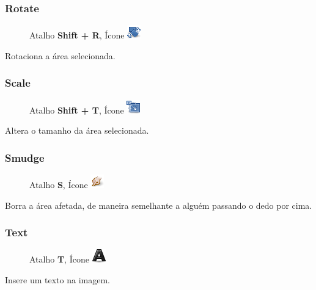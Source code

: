 \documentclass[12pt,onecolumn]{article}
\begin{document}
    \subsubsection{Rotate}
      \begin{figure}[H]
        Atalho {\bf Shift + R}, Ícone
        \includegraphics{gimp-icons/stock-tool-rotate-22.png}
        \label{fig:rotate}
      \end{figure}
      Rotaciona a área selecionada.
      
    \subsubsection{Scale}
      \begin{figure}[H]
        Atalho {\bf Shift + T}, Ícone
        \includegraphics{gimp-icons/stock-tool-scale-22.png}
        \label{fig:scale}
      \end{figure}
      Altera o tamanho da área selecionada.

    \subsubsection{Smudge}
      \begin{figure}[H]
        Atalho {\bf S}, Ícone
        \includegraphics{gimp-icons/stock-tool-smudge-22.png}
        \label{fig:smudge}
      \end{figure}
      Borra a área afetada, de maneira semelhante a alguém passando o dedo por cima.
      
    \subsubsection{Text}
      \begin{figure}[H]
        Atalho {\bf T}, Ícone
        \includegraphics{gimp-icons/stock-tool-text-22.png}
        \label{fig:text}
      \end{figure}
      Insere um texto na imagem.
\end{document}
